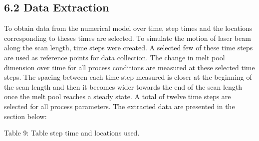 \documentclass[10pt]{article}
\begin{document}
\subsection*{6.2 Data Extraction}
To obtain data from the numerical model over time, step times and the locations corresponding to theses times are selected. To simulate the motion of laser beam along the scan length, time steps were created. A selected few of these time steps are used as reference points for data collection. The change in melt pool dimension over time for all process conditions are measured at these selected time steps. The spacing between each time step measured is closer at the beginning of the scan length and then it becomes wider towards the end of the scan length once the melt pool reaches a steady state. A total of twelve time steps are selected for all process parameters. The extracted data are presented in the section below:

Table 9: Table step time and locations used.
\end{document}
